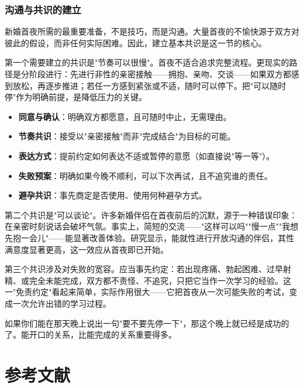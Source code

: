 \documentclass[12pt,UTF8]{ctexbook}
\newcommand{\keyword}[1]{\textbf{#1}}
\begin{document}
\subsection{沟通与共识的建立}

新婚首夜所需的最重要准备，不是技巧，而是沟通。大量首夜的不愉快源于双方对彼此的假设，而非任何实际困难。因此，建立基本共识是这一节的核心。

第一个需要建立的共识是"节奏可以很慢"。首夜不适合追求完整流程。更现实的路径是分阶段进行：先进行非性的亲密接触——拥抱、亲吻、交谈——如果双方都感到放松，再逐步推进；若任一方感到紧张或不适，随时可以停下。把"可以随时停"作为明确前提，是降低压力的关键。

\begin{itemize}
	\item \keyword{同意与确认}：明确双方都愿意，且可随时中止，无需理由。
	\item \keyword{节奏共识}：接受以"亲密接触"而非"完成结合"为目标的可能。
	\item \keyword{表达方式}：提前约定如何表达不适或暂停的意愿（如直接说"等一等"）。
	\item \keyword{失败预案}：明确如果今晚不顺利，可以下次再试，且不追究谁的责任。
	\item \keyword{避孕共识}：事先商定是否使用、使用何种避孕方式。
\end{itemize}

第二个共识是"可以谈论"。许多新婚伴侣在首夜前后的沉默，源于一种错误印象：在亲密时刻说话会破坏气氛。事实上，简短的交流——"这样可以吗""慢一点""我想先抱一会儿"——能显著改善体验。研究显示，能就性进行开放沟通的伴侣，其性满意度显著更高，这一效应从首夜即已开始。

第三个共识涉及对失败的宽容。应当事先约定：若出现疼痛、勃起困难、过早射精、或完全未能完成，双方都不责怪、不追究，只把它当作一次学习的经验。这一"免责约定"看起来简单，实际作用很大——它把首夜从一次可能失败的考试，变成一次允许出错的学习过程。

\begin{tcolorbox}[colback=pink!5!white,colframe=red!50!black,title=贴心小叮咛]
	如果你们能在那天晚上说出一句"要不要先停一下"，那这个晚上就已经是成功的了。能开口的关系，比能完成的关系重要得多。
\end{tcolorbox}

\chapter{参考文献}

\nocite{*}

\end{document}
